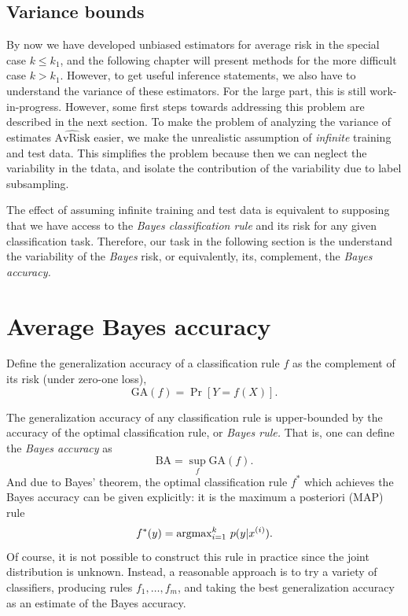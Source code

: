 \subsection{Variance bounds}

By now we have developed unbiased estimators for average risk in the
special case $k \leq k_1$, and the following chapter will present
methods for the more difficult case $k > k_1$.  However, to get useful
inference statements, we also have to understand the variance of these
estimators.  For the large part, this is still work-in-progress.
However, some first steps towards addressing this problem are
described in the next section.  To make the problem of analyzing the
variance of estimates $\hat{\text{AvRisk}}$ easier, we make the
unrealistic assumption of \emph{infinite} training and test data.
This simplifies the problem because then we can neglect the
variability in the tdata, and isolate the contribution of the
variability due to label subsampling.

The effect of assuming infinite training and test data is equivalent
to supposing that we have access to the \emph{Bayes classification
  rule} and its risk for any given classification task.  Therefore,
our task in the following section is the understand the variability of
the \emph{Bayes} risk, or equivalently, its, complement, the
\emph{Bayes accuracy.}

\section{Average Bayes accuracy}\label{sec:average_bayes_accuracy}


Define the generalization accuracy of a classification rule $f$ as the complement
of its risk (under zero-one loss),
\[
\text{GA}(f) = \Pr[Y = f(X)].
\]

The generalization accuracy of any classification rule is
upper-bounded by the accuracy of the optimal classification rule, or
\emph{Bayes rule.}  That is, one can define the \emph{Bayes accuracy}
as
\[
\text{BA} = \sup_f \text{GA}(f).
\]
And due to Bayes' theorem, the optimal classification rule $f^*$ which
achieves the Bayes accuracy can be given explicitly: it is the maximum a
posteriori (MAP) rule
\[
f^*(y) = \text{argmax}_{i=1}^k\ p(y|x^{(i)}).
\]
Of course, it is not possible to construct this rule in practice since
the joint distribution is unknown.  Instead, a reasonable approach is
to try a variety of classifiers, producing rules $f_1,\hdots, f_m$,
and taking the best generalization accuracy as an estimate of the Bayes
accuracy. 

